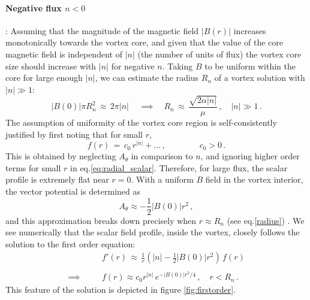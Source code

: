 \documentclass[12pt,a4paper]{article}
\def\be{\begin{equation}}
\def\ee{\end{equation}}
\newcommand{\bea}{\begin{eqnarray}}
\newcommand{\eea}{\end{eqnarray}}
\begin{document}
\paragraph{Negative flux $n<0$}: Assuming that the magnitude of the magnetic field $|B(r)|$ increases monotonically towards the vortex core, and given that the value of the core magnetic field is independent of $|n|$ (the number of units of flux) the vortex core size should  increase with $|n|$ for negative $n$. Taking $B$ to be uniform within the core for large enough $|n|$, we can estimate the radius $R_n$ of a vortex solution with $|n|\gg 1$:
\be
|B(0)|\pi R_n^2 \,\approx \, 2\pi |n| \,\quad\implies\quad R_n\,\approx\,\frac{\sqrt{2\alpha|n|}}{\mu}\,,\quad |n|\gg1\,.
\label{radius}
\ee
The assumption of uniformity of the vortex core region is self-consistently justified by first noting that for small $r$,
\be
f(r)\,=\,c_0\,r^{|n|} +\ldots\,,\qquad \qquad c_0 >0\,.
\ee 
This is obtained by neglecting $A_\theta$ in comparison to $n$, and ignoring higher order terms for small $r$ in eq.\eqref{eq:radial_scalar}. 
Therefore, for large flux, the scalar profile is extremely flat near $r=0$. With a uniform $B$ field in the vortex interior, the vector potential is determined as 
\be
 A_\theta\approx-\frac{1}{2} |B(0)| r^2\,,
\ee
and this approximation breaks down precisely when $r\approx R_n$
(see eq.\eqref{radius}) . 
We see numerically that the scalar field profile,  inside the vortex, closely follows the solution to the first order equation:
\bea
&&f'(r)\,\approx\,\tfrac{1}{r}\left(|n|-\tfrac{1}{2}|B(0)|r^2\right)\, f(r)\\\nonumber\\\nonumber
\implies \quad&&f(r)\approx c_0 r^{|n|}\,e^{-|B(0)|r^2/4}\,,\quad r< R_n\,.
\eea
This feature of the solution  is depicted in figure \ref{fig:firstorder}. 
\end{document}
